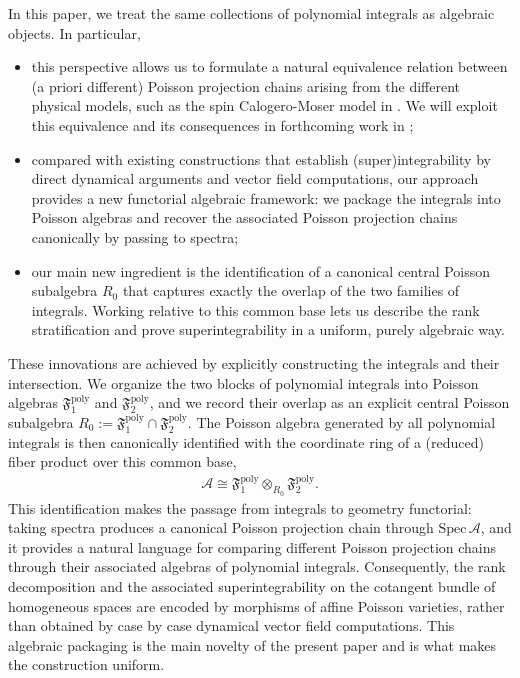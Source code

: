 \documentclass[11pt]{amsart}
\theoremstyle{definition}
\theoremstyle{plain}
\theoremstyle{conclusion}
\begin{document}
In this paper, we treat the same collections of polynomial integrals as algebraic objects. In particular, \begin{itemize}
    \item this perspective allows us to formulate a natural equivalence relation between (a priori different) Poisson projection chains arising from the different physical models, such as the spin Calogero-Moser model in \cite{MR4285685}. We will exploit this equivalence and its consequences in forthcoming work in \cite{Jiang2026reduced,Jiang2026reducedi};
    \item compared with existing constructions that establish (super)integrability by direct dynamical arguments and vector field computations, our approach provides a new functorial algebraic framework: we package the integrals into Poisson algebras and recover the associated Poisson projection chains canonically by passing to spectra;
    \item our main new ingredient is the identification of a canonical central Poisson subalgebra $R_0$ that captures exactly the overlap of the two families of integrals. Working relative to this common base lets us describe the rank stratification and prove superintegrability in a uniform, purely algebraic way.
\end{itemize}
These innovations are achieved by explicitly constructing the integrals and their intersection. We organize the two blocks of polynomial integrals into Poisson algebras $\mathfrak{F}_1^{\mathrm{poly}}$ and $\mathfrak{F}_2^{\mathrm{poly}}$, and we record their overlap as an explicit central Poisson subalgebra $R_0:=\mathfrak{F}_1^{\mathrm{poly}}\cap \mathfrak{F}_2^{\mathrm{poly}}$. The Poisson algebra generated by all polynomial integrals is then canonically identified with the coordinate ring of a (reduced) fiber product over this common base,
\begin{align*}
 \mathcal{A} \cong \mathfrak{F}_1^{\mathrm{poly}} \otimes_{R_0} \mathfrak{F}_2^{\mathrm{poly}}.
\end{align*}
This identification makes the passage from integrals to geometry functorial: taking spectra produces a canonical Poisson projection chain through $\mathrm{Spec}\,\mathcal{A}$, and it provides a natural language for comparing different Poisson projection chains through their associated algebras of polynomial integrals. %
Consequently, the rank decomposition and the associated superintegrability on the cotangent bundle of homogeneous spaces are encoded by morphisms of affine Poisson varieties, rather than obtained by case by case dynamical vector field computations. This algebraic packaging is the main novelty of the present paper and is what makes the construction uniform.
\end{document}
